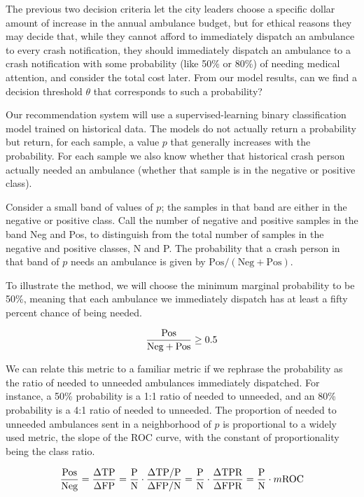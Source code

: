 The previous two decision criteria let the city leaders choose a specific dollar amount of increase in the annual ambulance budget, but for ethical reasons they may decide that, while they cannot afford to immediately dispatch an ambulance to every crash notification, they should immediately dispatch an ambulance to a crash notification with some probability (like 50\% or 80\%) of needing medical attention, and consider the total cost later.  From our model results, can we find a decision threshold $\theta$ that corresponds to such a probability?

Our recommendation system will use a supervised-learning binary classification model trained on historical data. The models do not actually return a probability but return, for each sample, a value $p$ that generally increases with the probability.  For each sample we also know whether that historical crash person actually needed an ambulance (whether that sample is in the negative or positive class).  

Consider a small band of values of $p$; the samples in that band are either in the negative or positive class.  Call the number of negative and positive samples in the band Neg and Pos, to distinguish from the total number of samples in the negative and positive classes, N and P.  The probability that a crash person in that band of $p$ needs an ambulance is given by 
$\text{Pos}/(\text{Neg} + \text{Pos})$.  

To illustrate the method, we will choose the minimum marginal probability to be 50\%, meaning that each ambulance we immediately dispatch has at least a fifty percent chance of being needed.  

\begin{equation} \label{eq:budget_3}\hfil
\frac{\text{Pos}}{\text{Neg}+\text{Pos}} \ge 0.5
\end{equation}


We can relate this metric to a familiar metric if we rephrase the probability as the ratio of needed to unneeded ambulances immediately dispatched.  For instance, a 50\% probability is a 1:1 ratio of needed to unneeded, and an 80\% probability is a 4:1 ratio of needed to unneeded.  
The proportion of needed to unneeded ambulances sent in a neighborhood of $p$ is proportional to a widely used metric, the slope of the ROC curve, with the constant of proportionality being the class ratio.  

\begin{equation} \label{eq:ROC_slope}\hfil
\frac{\text{Pos}}{\text{Neg}}
=\frac{\Delta\text{TP}}{\Delta \text{FP}}
=\frac{\text{P}}{\text{N}} \cdot \frac{\Delta\text{TP}/\text{P}}{\Delta \text{FP}/\text{N}} 
=\frac{\text{P}}{\text{N}} \cdot \frac{\Delta\text{TPR}}{\Delta \text{FPR}}
=\frac{\text{P}}{\text{N}} \cdot m\text{ROC}
\end{equation}


